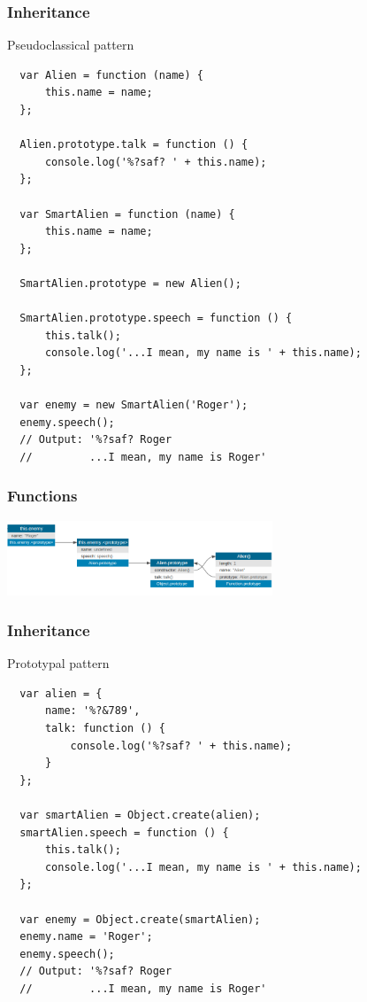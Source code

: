 \begin{frame}[fragile]
  \frametitle{Inheritance}

  \begin{block}{Pseudoclassical pattern}
  {\tiny
  \begin{verbatim}
  var Alien = function (name) {
      this.name = name;
  };

  Alien.prototype.talk = function () {
      console.log('%?saf? ' + this.name);
  };

  var SmartAlien = function (name) {
      this.name = name;
  };

  SmartAlien.prototype = new Alien();

  SmartAlien.prototype.speech = function () {
      this.talk();
      console.log('...I mean, my name is ' + this.name);
  };

  var enemy = new SmartAlien('Roger');
  enemy.speech(); 
  // Output: '%?saf? Roger
  //         ...I mean, my name is Roger'
  \end{verbatim}
  }
  \end{block}
\end{frame}

\begin{frame}[fragile]
  \frametitle{Functions}
  \begin{center}
    \includegraphics[width=300px]{images/classical_pattern.png}
  \end{center}
\end{frame}

\begin{frame}[fragile]
  \frametitle{Inheritance}

  \begin{block}{Prototypal pattern}
  {\tiny
  \begin{verbatim}
  var alien = {
      name: '%?&789',
      talk: function () {
          console.log('%?saf? ' + this.name);
      }
  };

  var smartAlien = Object.create(alien);
  smartAlien.speech = function () {
      this.talk();
      console.log('...I mean, my name is ' + this.name);
  };

  var enemy = Object.create(smartAlien);
  enemy.name = 'Roger';
  enemy.speech(); 
  // Output: '%?saf? Roger
  //         ...I mean, my name is Roger'
  \end{verbatim}
  }
  \end{block}
\end{frame}

